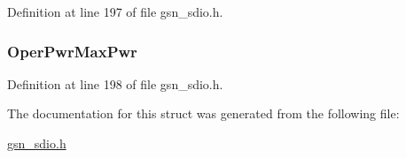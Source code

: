 Definition at line 197 of file gsn\_\-sdio.h.

\hypertarget{a00220_a48d11a792eedf73d120155f01b711001}{
\subsubsection[{OperPwrMaxPwr}]{ {\bf OperPwrMaxPwr}}}
\label{a00220_a48d11a792eedf73d120155f01b711001}


Definition at line 198 of file gsn\_\-sdio.h.



The documentation for this struct was generated from the following file:\begin{DoxyCompactItemize}
\item 
\hyperlink{a00584}{gsn\_\-sdio.h}\end{DoxyCompactItemize}
